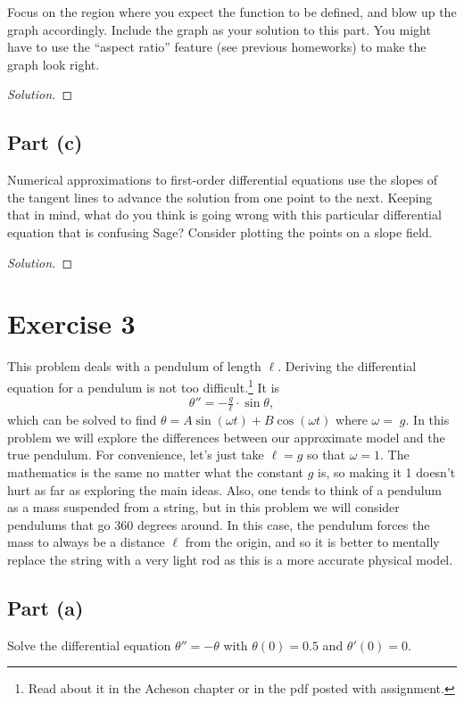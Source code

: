 \documentclass[letterpaper, 12pt]{amsart}
\theoremstyle{definition}  							%
\begin{document}
		Focus on the region where you expect the function to be defined, and blow up the graph accordingly. 
		Include the graph as your solution to this part. 
		You might have to use the ``aspect ratio'' feature (see previous homeworks) to make the graph look right.

		\begin{proof}[Solution]
		\end{proof}

		\subsection*{Part (c)}
		Numerical approximations to first-order differential equations use the slopes of the tangent lines to advance the solution from one point to the next. 
		Keeping that in mind, what do you think is going wrong with this particular differential equation that is confusing Sage? 
		Consider plotting the points on a slope field.

		\begin{proof}[Solution]
		\end{proof}

	\section*{Exercise 3}
	This problem deals with a pendulum of length $\ell$. 
	Deriving the differential equation for a pendulum is not too difficult.\footnote{Read about it in the Acheson chapter or in the pdf posted with assignment.}
	It is $$\theta'' = -\tfrac{g}{\ell} \cdot \sin\theta,$$ which can be solved to find $\theta = A \sin(\omega t) + B \cos(\omega t)$ where $\omega = 􏰃g$. 
	In this problem we will explore the differences between our approximate model and the true pendulum. 
	For convenience, let’s just take $\ell = g$ so that $\omega = 1$. 
	The mathematics is the same no matter what the constant $g$ is, so making it 1 doesn’t hurt as far as exploring the main ideas.
	Also, one tends to think of a pendulum as a mass suspended from a string, but in this problem we will consider pendulums that go 360 degrees around. 
	In this case, the pendulum forces the mass to always be a distance $\ell$ from the origin, and so it is better to mentally replace the string with a very light rod as this is a more accurate physical model.

		\subsection*{Part (a)}
		Solve the differential equation $\theta'' = -\theta$ with $\theta(0) = 0.5$ and $\theta'(0) = 0$.
\end{document}

